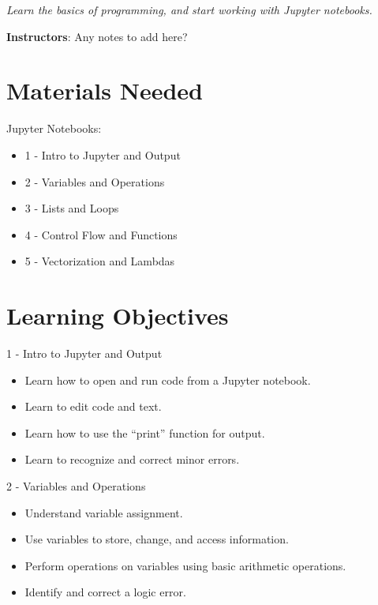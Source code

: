 \documentclass[11pt]{article}
\begin{document}


\Pfrontheader  
\SetBgContents{\PtikzHead} %


\emph{Learn the basics of programming, and start working with Jupyter notebooks.} 

\textbf{Instructors}: {\color{red}Any notes to add here? }

\section*{Materials Needed}

Jupyter Notebooks:
\begin{itemize}
\item 1 - Intro to Jupyter and Output
\item 2 - Variables and Operations
\item 3 - Lists and Loops
\item 4 - Control Flow and Functions
\item {\color{red} 5 - Vectorization and Lambdas}
\end{itemize}

\section*{Learning Objectives}

1 - Intro to Jupyter and Output
\begin{itemize}
\item Learn how to open and run code from a Jupyter notebook.
\item Learn to edit code and text.
\item Learn how to use the ``print'' function for output.
\item Learn to recognize and correct minor errors.
\end{itemize}

2 - Variables and Operations
\begin{itemize}
\item Understand variable assignment.
\item Use variables to store, change, and access information.
\item Perform operations on variables using basic arithmetic operations.
\item Identify and correct a logic error.
\end{itemize}
\end{document}
